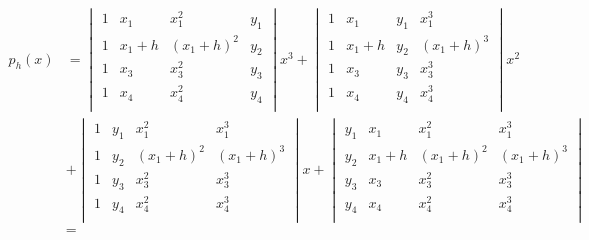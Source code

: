 \documentclass[english,11pt,a4paper]{article}
\begin{document}
\begin{align*}
  p_h(x) &=
  \begin{vmatrix}
  1 & x_1 & x_1^2 & y_1\\
  1 & x_1+h & (x_1 + h)^2 & y_2\\
  1 & x_3 & x_3^2 & y_3\\
  1 & x_4 & x_4^2 & y_4\\
  \end{vmatrix}
  x^3 +
  \begin{vmatrix}
  1 & x_1 & y_1 & x_1^3\\
  1 & x_1+h & y_2 & (x_1 + h)^3\\
  1 & x_3 & y_3 & x_3^3\\
  1 & x_4 & y_4 & x_4^3\\
  \end{vmatrix}
  x^2 \\&+
  \begin{vmatrix}
  1 & y_1 & x_1^2 & x_1^3\\
  1 & y_2 & (x_1 + h)^2 & (x_1 + h)^3\\
  1 & y_3 & x_3^2 & x_3^3\\
  1 & y_4 & x_4^2 & x_4^3\\
  \end{vmatrix}
  x +
  \begin{vmatrix}
  y_1 & x_1 & x_1^2 & x_1^3\\
  y_2 & x_1+h & (x_1 + h)^2 & (x_1 + h)^3\\
  y_3 & x_3 & x_3^2 & x_3^3\\
  y_4 & x_4 & x_4^2 & x_4^3\\
  \end{vmatrix}
  \\&=
\end{align*}
\end{document}
